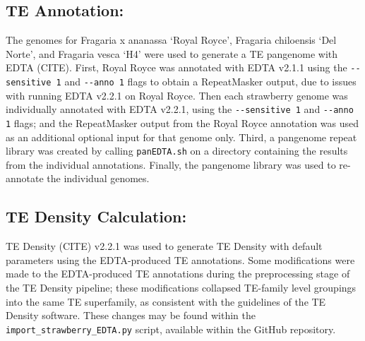 \documentclass[fleqn,10pt]{olplainarticle}
\begin{document}

% 

\subsection{TE Annotation:} \label{sec:EDTA_methods}
The genomes for Fragaria x ananassa `Royal Royce', Fragaria chiloensis `Del Norte', and Fragaria vesca `H4' were used to generate a TE pangenome with EDTA (CITE).
First, Royal Royce was annotated with EDTA v2.1.1 using the \verb|--sensitive 1| and \verb|--anno 1| flags to obtain a RepeatMasker output, due to issues with running EDTA v2.2.1 on Royal Royce.
Then each strawberry genome was individually annotated with EDTA v2.2.1, using the \verb|--sensitive 1| and \verb|--anno 1| flags; and the RepeatMasker output from the Royal Royce annotation was used as an additional optional input for that genome only.
Third, a pangenome repeat library was created by calling \verb|panEDTA.sh| on a directory containing the results from the individual annotations.
Finally, the pangenome library was used to re-annotate the individual genomes.

\subsection{TE Density Calculation:} \label{sec:density_methods}
TE Density (CITE) v2.2.1 was used to generate TE Density with default parameters using the EDTA-produced TE annotations.
Some modifications were made to the EDTA-produced TE annotations during the preprocessing stage of the TE Density pipeline; these modifications collapsed TE-family level groupings into the same TE superfamily, as consistent with the guidelines of the TE Density software.
These changes may be found within the \verb|import_strawberry_EDTA.py| script, available within the GitHub repository.
\end{document}
